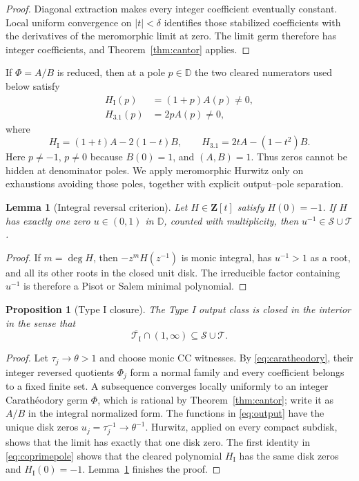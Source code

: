 \documentclass[11pt,reqno]{amsart}
\newtheorem{proposition}[theorem]{Proposition}
\newtheorem{lemma}[theorem]{Lemma}
\theoremstyle{definition}
\theoremstyle{remark}
\newcommand{\D}{\mathbb D}
\newcommand{\Z}{\mathbf Z}
\newcommand{\calS}{\mathcal S}
\newcommand{\calT}{\mathcal T}
\begin{document}
\begin{proof}
Diagonal extraction makes every integer coefficient eventually constant.
Local uniform convergence on $|t|<\delta$ identifies those stabilized
coefficients with the derivatives of the meromorphic limit at zero.  The
limit germ therefore has integer coefficients, and
Theorem~\ref{thm:cantor} applies.
\end{proof}

If $\Phi=A/B$ is reduced, then at a pole $p\in\D$ the two cleared numerators
used below satisfy
\begin{equation}\label{eq:coprimepole}
 \begin{aligned}
 H_{\mathrm I}(p)&=(1+p)A(p)\ne0,\\
 H_{3.1}(p)&=2pA(p)\ne0,
 \end{aligned}
\end{equation}
where
\[
 H_{\mathrm I}=(1+t)A-2(1-t)B,\qquad
 H_{3.1}=2tA-(1-t^2)B.
\]
Here $p\ne-1$, $p\ne0$ because $B(0)=1$, and $(A,B)=1$.  Thus zeros cannot be
hidden at denominator poles.  We apply meromorphic Hurwitz only on
exhaustions avoiding those poles, together with explicit output--pole
separation.

\begin{lemma}[Integral reversal criterion]\label{lem:reversal}
Let $H\in\Z[t]$ satisfy $H(0)=-1$.  If $H$ has exactly one zero
$u\in(0,1)$ in $\D$, counted with multiplicity, then
$u^{-1}\in\calS\cup\calT$.
\end{lemma}

\begin{proof}
If $m=\deg H$, then
$-z^mH(z^{-1})$ is monic integral, has $u^{-1}>1$ as a root, and all its
other roots in the closed unit disk.  The irreducible factor containing
$u^{-1}$ is therefore a Pisot or Salem minimal polynomial.
\end{proof}

\begin{proposition}[Type I closure]\label{prop:typeI}
The Type I output class is closed in the interior in the sense that
\[
 \overline{\calT_{\mathrm I}}\cap(1,\infty)
 \subseteq\calS\cup\calT.
\]
\end{proposition}

\begin{proof}
Let $\tau_j\to\theta>1$ and choose monic CC witnesses.  By
\eqref{eq:caratheodory}, their integer reversed quotients $\Phi_j$ form a
normal family and every coefficient belongs to a fixed finite set.  A
subsequence converges locally uniformly to an integer Carath\'eodory germ
$\Phi$, which is rational by Theorem~\ref{thm:cantor}; write it as $A/B$ in
the integral normalized form.  The functions in \eqref{eq:output} have the
unique disk zeros $u_j=\tau_j^{-1}\to\theta^{-1}$.  Hurwitz, applied on every
compact subdisk, shows that the limit has exactly that one disk zero.  The
first identity in \eqref{eq:coprimepole} shows that the cleared polynomial
$H_{\mathrm I}$ has the same disk zeros and $H_{\mathrm I}(0)=-1$.
Lemma~\ref{lem:reversal} finishes the proof.
\end{proof}
\end{document}
